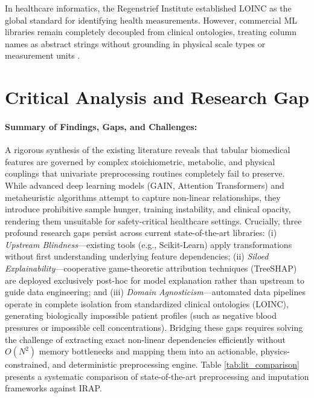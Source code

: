 \documentclass[MTech]{ugthesis}
\begin{document}
In healthcare informatics, the Regenstrief Institute established \ac{LOINC} \citep{regenstrief2024loinc} as the global standard for identifying health measurements. However, commercial \ac{ML} libraries remain completely decoupled from clinical ontologies, treating column names as abstract strings without grounding in physical scale types or measurement units \citep{ada2024standards, who2023hypertension}.

\section{Critical Analysis and Research Gap}\label{sec:lit_gap}
\paragraph{Summary of Findings, Gaps, and Challenges:}
A rigorous synthesis of the existing literature reveals that tabular biomedical features are governed by complex stoichiometric, metabolic, and physical couplings that univariate preprocessing routines completely fail to preserve. While advanced deep learning models (\ac{GAIN}, Attention Transformers) and metaheuristic algorithms attempt to capture non-linear relationships, they introduce prohibitive sample hunger, training instability, and clinical opacity, rendering them unsuitable for safety-critical healthcare settings. Crucially, three profound research gaps persist across current state-of-the-art libraries: (i) \textit{Upstream Blindness}—existing tools (e.g., Scikit-Learn) apply transformations without first understanding underlying feature dependencies; (ii) \textit{Siloed Explainability}—cooperative game-theoretic attribution techniques (Tree\ac{SHAP}) are deployed exclusively post-hoc for model explanation rather than upstream to guide data engineering; and (iii) \textit{Domain Agnosticism}—automated data pipelines operate in complete isolation from standardized clinical ontologies (\ac{LOINC}), generating biologically impossible patient profiles (such as negative blood pressures or impossible cell concentrations). Bridging these gaps requires solving the challenge of extracting exact non-linear dependencies efficiently without $O(N^2)$ memory bottlenecks and mapping them into an actionable, physics-constrained, and deterministic preprocessing engine. Table \ref{tab:lit_comparison} presents a systematic comparison of state-of-the-art preprocessing and imputation frameworks against \ac{IRAP}.
\end{document}
